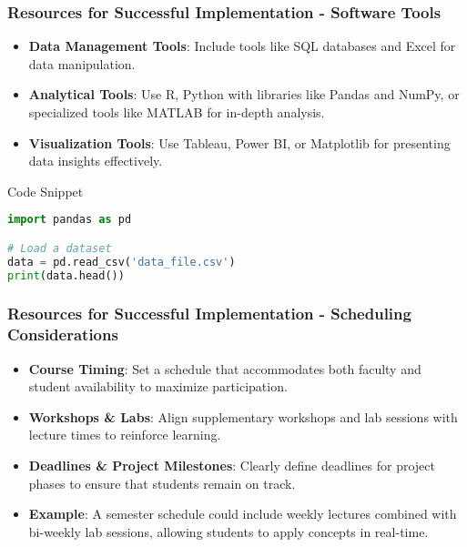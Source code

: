 \documentclass[aspectratio=169]{beamer}
\begin{document}
\begin{frame}[fragile]
    \frametitle{Resources for Successful Implementation - Software Tools}
    \begin{itemize}
        \item \textbf{Data Management Tools}: Include tools like SQL databases and Excel for data manipulation.
        \item \textbf{Analytical Tools}: Use R, Python with libraries like Pandas and NumPy, or specialized tools like MATLAB for in-depth analysis.
        \item \textbf{Visualization Tools}: Use Tableau, Power BI, or Matplotlib for presenting data insights effectively.
    \end{itemize}
    \begin{block}{Code Snippet}
        \begin{lstlisting}[language=Python]
import pandas as pd

# Load a dataset
data = pd.read_csv('data_file.csv')
print(data.head())
        \end{lstlisting}
    \end{block}
\end{frame}

\begin{frame}[fragile]
    \frametitle{Resources for Successful Implementation - Scheduling Considerations}
    \begin{itemize}
        \item \textbf{Course Timing}: Set a schedule that accommodates both faculty and student availability to maximize participation.
        \item \textbf{Workshops \& Labs}: Align supplementary workshops and lab sessions with lecture times to reinforce learning.
        \item \textbf{Deadlines \& Project Milestones}: Clearly define deadlines for project phases to ensure that students remain on track.
        \item \textbf{Example}: A semester schedule could include weekly lectures combined with bi-weekly lab sessions, allowing students to apply concepts in real-time.
    \end{itemize}
\end{frame}
\end{document}
